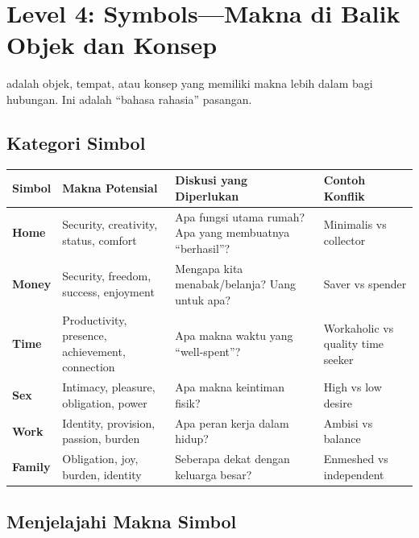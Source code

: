 \section{Level 4: Symbols---Makna di Balik Objek dan Konsep}

 adalah objek, tempat, atau konsep yang memiliki makna lebih dalam bagi hubungan. Ini adalah ``bahasa rahasia'' pasangan.

\subsection{Kategori Simbol}

\begin{center}
\renewcommand{\arraystretch}{1.6}
\begin{tabular}{|>{\raggedright}p{3cm}|>{\raggedright}p{4.5cm}|>{\raggedright}p{4.5cm}|>{\raggedright\arraybackslash}p{3cm}|}
\hline
\rowcolor{primary!20}
\textbf{Simbol} & \textbf{Makna Potensial} & \textbf{Diskusi yang Diperlukan} & \textbf{Contoh Konflik} \\
\hline
\textbf{Home} & Security, creativity, status, comfort & Apa fungsi utama rumah? Apa yang membuatnya ``berhasil''? & Minimalis vs collector \\
\hline
\textbf{Money} & Security, freedom, success, enjoyment & Mengapa kita menabak/belanja? Uang untuk apa? & Saver vs spender \\
\hline
\textbf{Time} & Productivity, presence, achievement, connection & Apa makna waktu yang ``well-spent''? & Workaholic vs quality time seeker \\
\hline
\textbf{Sex} & Intimacy, pleasure, obligation, power & Apa makna keintiman fisik? & High vs low desire \\
\hline
\textbf{Work} & Identity, provision, passion, burden & Apa peran kerja dalam hidup? & Ambisi vs balance \\
\hline
\textbf{Family} & Obligation, joy, burden, identity & Seberapa dekat dengan keluarga besar? & Enmeshed vs independent \\
\hline
\end{tabular}
\end{center}

\subsection{Menjelajahi Makna Simbol}

